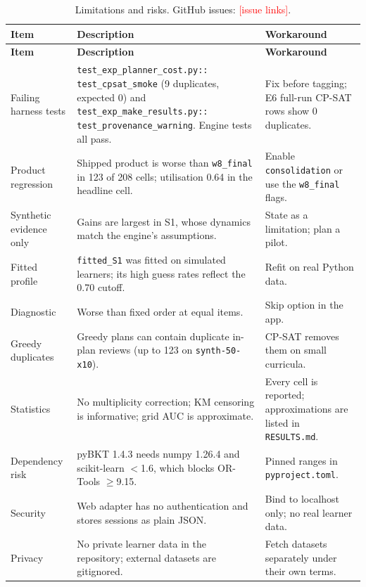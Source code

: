 \documentclass[11pt,a4paper]{article}
\newcommand{\fillin}[1]{\textcolor{red}{[#1]}}
\begin{document}
\begin{xltabular}{\textwidth}{
    @{}
    >{\raggedright\arraybackslash}p{0.24\textwidth}
    >{\raggedright\arraybackslash}X
    >{\raggedright\arraybackslash}p{0.22\textwidth}
    @{}
}
\caption{Limitations and risks. GitHub issues: \fillin{issue links}.}
\label{tab:risks}\\
\toprule
\textbf{Item} & \textbf{Description} & \textbf{Workaround} \\
\midrule
\endfirsthead
\toprule
\textbf{Item} & \textbf{Description} & \textbf{Workaround} \\
\midrule
\endhead
\bottomrule
\endfoot
Failing harness tests & \texttt{test\_exp\_planner\_cost.py::} \texttt{test\_cpsat\_smoke} (9 duplicates, expected 0) and \texttt{test\_exp\_make\_results.py::} \texttt{test\_provenance\_warning}. Engine tests all pass. & Fix before tagging; E6 full-run CP-SAT rows show 0 duplicates. \\
Product regression & Shipped product is worse than \texttt{w8\_final} in 123 of 208 cells; utilisation 0.64 in the headline cell. & Enable \texttt{consolidation} or use the \texttt{w8\_final} flags. \\
Synthetic evidence only & Gains are largest in S1, whose dynamics match the engine's assumptions. & State as a limitation; plan a pilot. \\
Fitted profile & \texttt{fitted\_S1} was fitted on simulated learners; its high guess rates reflect the 0.70 cutoff. & Refit on real Python data. \\
Diagnostic & Worse than fixed order at equal items. & Skip option in the app. \\
Greedy duplicates & Greedy plans can contain duplicate in-plan reviews (up to 123 on \texttt{synth-50-x10}). & CP-SAT removes them on small curricula. \\
Statistics & No multiplicity correction; KM censoring is informative; grid AUC is approximate. & Every cell is reported; approximations are listed in \texttt{RESULTS.md}. \\
Dependency risk & pyBKT 1.4.3 needs numpy 1.26.4 and scikit-learn $<$1.6, which blocks OR-Tools $\ge$9.15. & Pinned ranges in \texttt{pyproject.toml}. \\
Security & Web adapter has no authentication and stores sessions as plain JSON. & Bind to localhost only; no real learner data. \\
Privacy & No private learner data in the repository; external datasets are gitignored. & Fetch datasets separately under their own terms. \\
\end{xltabular}
\end{document}
